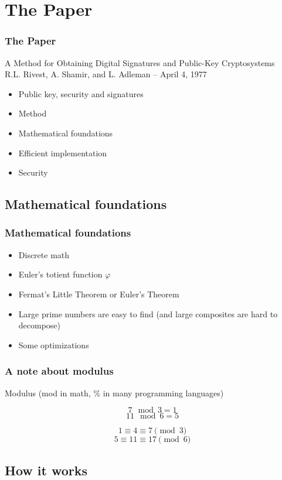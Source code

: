 \documentclass{beamer}
\begin{document}
\section{The Paper}

\begin{frame}
	\frametitle{The Paper}
		A Method for Obtaining Digital Signatures and Public-Key Cryptosystems \\
		R.L. Rivest, A. Shamir, and L. Adleman -- April 4, 1977
		\begin{itemize}
			\item Public key, security and signatures
			\item Method
			\item Mathematical foundations
			\item Efficient implementation
			\item Security
		\end{itemize}
\end{frame}

\subsection{Mathematical foundations}

\begin{frame}
	\frametitle{Mathematical foundations}
	\begin{itemize}
		\item Discrete math
		\item Euler's totient function $\varphi$
		\item Fermat's Little Theorem or Euler's Theorem
		\item Large prime numbers are easy to find (and large
		      composites are hard to decompose)
		\item Some optimizations
	\end{itemize}
\end{frame}

\begin{frame}
	\frametitle{A note about modulus}

	Modulus (mod in math, \% in many programming languages)

	$$ 7 \mod 3 = 1 $$
	$$ 11 \mod 6 = 5 $$

	$$ 1 \equiv 4 \equiv 7 \pmod{3} $$
	$$ 5 \equiv 11 \equiv 17 \pmod{6} $$
\end{frame}

\subsection{How it works}
\end{document}
